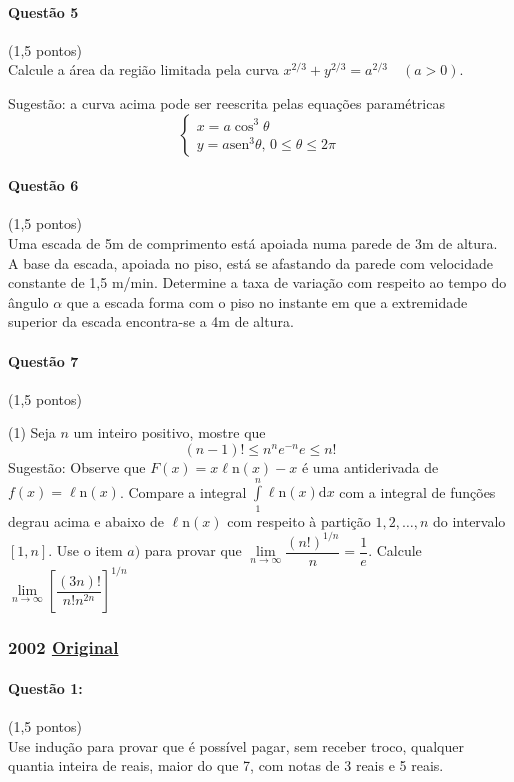 \documentclass[12pt,a4paper]{article}
\newcommand{\sen}{\mathrm{sen}}
\newcommand{\dd}{\mathrm{d}}
\newcommand{\Ln}{\ell\mathrm{n}}
\newcommand{\original}[1]{\tiny \href{#1}{Original} \normalsize}
\begin{document}
{\begin{multicols}{2}
\paragraph{Questão 5} (1,5 pontos)\\
Calcule a área da região limitada pela curva $x^{2/3}+y^{2/3} = a^{2/3}\quad (a>0)$.

Sugestão: a curva acima pode ser reescrita pelas equações paramétricas$$\begin{cases}x=a\cos ^3 \theta \\ y = a\sen ^3 \theta,\, 0 \le \theta \le 2\pi \end{cases}$$\paragraph{Questão 6} (1,5 pontos)\\
Uma escada de 5m de comprimento está apoiada numa parede de 3m de altura. A base da escada, apoiada no piso, está se afastando da parede com velocidade constante de 1,5 m/min. Determine a taxa de variação com respeito ao tempo do ângulo $\alpha$ que a escada forma com o piso no instante em que a extremidade superior da escada encontra-se a 4m de altura.

\paragraph{Questão 7} (1,5 pontos)
\begin{tasks}(1)
\task Seja $n$ um inteiro positivo, mostre que $$(n-1)! \le n^n e^{-n} e \le n!$$Sugestão: Observe que $F(x) = x\Ln (x) - x$ é uma antiderivada de $f(x) = \Ln (x)$. Compare a integral $\int\limits_1^n \Ln (x) \dd x$ com a integral de funções degrau acima e abaixo de $\Ln (x)$ com respeito à partição ${1, 2, \dots, n}$ do intervalo $[1, n]$.
\task Use o item $a)$ para provar que $\lim\limits_{n\to \infty} \dfrac{(n!)^{1/n}}{n} = \dfrac{1}{e}$.
\task Calcule $\lim\limits_{n\to \infty}\left[ \dfrac{(3n)!}{n!n^{2n}} \right]^{1/n}$
\end{tasks}

\end{multicols}
}
\normalsize
\newpage
\subsubsection{2002 \original{https://drive.google.com/open?id=13bYttzTWI9Dzl9JcHPNK3RO4Ekr8OiHa}}

\paragraph{Questão 1:}(1,5 pontos)\\
Use indução para provar que é possível pagar, sem receber troco, qualquer quantia inteira de reais, maior do que 7, com notas de 3 reais e 5 reais.
\end{document}
